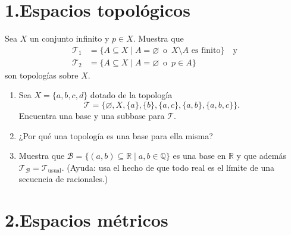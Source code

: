 \documentclass[b5paper,10pt,twoside]{book}
\begin{document}
\def\thetitle{Tarea 01}



\section*{1.\enspace Espacios topológicos}


\begin{problem}
Sea $X$ un conjunto infinito y $p \in X$. Muestra que
\begin{align*}
\mathcal{T}_1 &= \{ A \subseteq X \mid A = \varnothing \, \text{ o } \, X \setminus A \text{ es finito} \}\quad\text{y}\\
\mathcal{T}_2 &= \{ A \subseteq X \mid A = \varnothing \, \text{ o } \, p \in A \}
\end{align*}
son topologías sobre $X$.

\end{problem}



\begin{problem}\hfill\null
\begin{enumerate}[label=(\roman*)]
\item Sea $X = \{a, b, c, d\}$ dotado de la topología
\[
\mathcal{T} = \{\varnothing, X, \{a\}, \{b\}, \{a, c\}, \{a, b\}, \{a, b, c\}\}.
\]
Encuentra una base y una subbase para $\mathcal{T}$.

\item ¿Por qué una topología es una base para ella misma?

\item Muestra que \(\mathcal{B}  = \{(a, b) \subseteq \mathbb{R} \mid a, b \in \mathbb{Q}\}\)  
es una  base en $\mathbb{R}$ y que además $\mathcal{T}_{\mathcal{B}} = \mathcal{T}_{\text{usual}}$. (Ayuda: usa el hecho de que todo real es el límite de una secuencia de racionales.)
\end{enumerate}


\end{problem}
 




\section*{2.\enspace Espacios métricos}
\end{document}
